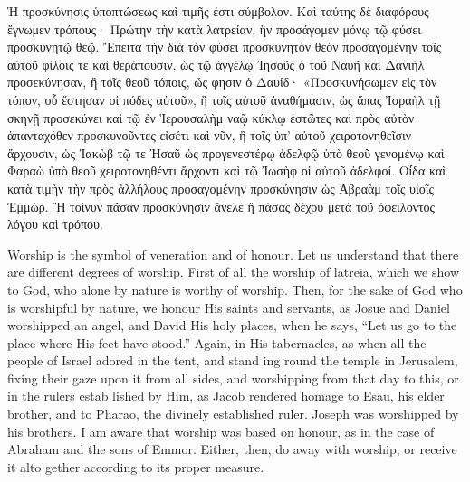 \documentclass[10pt]{book}
\newcommand{\switchGreek}[1][]{\selectlanguage{polutonikogreek} \switchcolumn*[#1]}
\newcommand{\switchEnglish}{\selectlanguage{english} \switchcolumn}
\begin{document}
\begin{paracol}{2}
\switchGreek

Ἡ προσκύνησις ὑποπτώσεως καὶ τιμῆς ἐστι σύμβολον. Καὶ ταύτης δὲ διαφόρους ἔγνωμεν τρόπους· Πρώτην τὴν κατὰ λατρείαν, ἣν προσάγομεν μόνῳ τῷ φύσει προσκυνητῷ θεῷ. Ἔπειτα τὴν διὰ τὸν φύσει προσκυνητὸν θεὸν προσαγομένην τοῖς αὐτοῦ φίλοις τε καὶ θεράπουσιν, ὡς τῷ ἀγγέλῳ Ἰησοῦς ὁ τοῦ Ναυῆ καὶ Δανιὴλ προσεκύνησαν, ἢ τοῖς θεοῦ τόποις, ὥς φησιν ὁ Δαυίδ· «Προσκυνήσωμεν εἰς τὸν τόπον, οὗ ἔστησαν οἱ πόδες αὐτοῦ», ἢ τοῖς αὐτοῦ ἀναθήμασιν, ὡς ἅπας Ἰσραὴλ τῇ σκηνῇ προσεκύνει καὶ τῷ ἐν Ἱερουσαλὴμ ναῷ κύκλῳ ἑστῶτες καὶ πρὸς αὐτὸν ἁπανταχόθεν προσκυνοῦντες εἰσέτι καὶ νῦν, ἢ τοῖς ὑπ’ αὐτοῦ χειροτονηθεῖσιν ἄρχουσιν, ὡς Ἰακὼβ τῷ τε Ἠσαῦ ὡς προγενεστέρῳ ἀδελφῷ ὑπὸ θεοῦ γενομένῳ καὶ Φαραὼ ὑπὸ θεοῦ χειροτονηθέντι ἄρχοντι καὶ τῷ Ἰωσὴφ οἱ αὐτοῦ ἀδελφοί. Οἶδα καὶ κατὰ τιμὴν τὴν πρὸς ἀλλήλους προσαγομένην προσκύνησιν ὡς Ἀβραὰμ τοῖς υἱοῖς Ἐμμώρ. Ἢ τοίνυν πᾶσαν προσκύνησιν ἄνελε ἢ πάσας δέχου μετὰ τοῦ ὀφείλοντος λόγου καὶ τρόπου.

\switchEnglish

Worship is the symbol of veneration and of 
honour. Let us understand that there are 
different degrees of worship. First of all the 
worship of latreia, which we show to God, who 
alone by nature is worthy of worship. Then, 
for the sake of God who is worshipful by 
nature, we honour His saints and servants, as 
Josue and Daniel worshipped an angel, and 
David His holy places, when he says, ``Let 
us go to the place where His feet have stood.'' 
Again, in His tabernacles, as when all the 
people of Israel adored in the tent, and stand 
ing round the temple in Jerusalem, fixing their 
gaze upon it from all sides, and worshipping 
from that day to this, or in the rulers estab 
lished by Him, as Jacob rendered homage to 
Esau, his elder brother, and to Pharao, the 
divinely established ruler. Joseph was worshipped by his brothers. I am aware that 
worship was based on honour, as in the case 
of Abraham and the sons of Emmor. Either, 
then, do away with worship, or receive it alto 
gether according to its proper measure. 

\switchGreek


\end{paracol}
\end{document}

